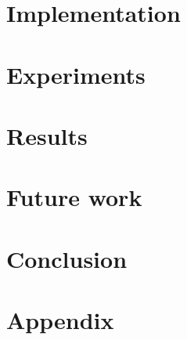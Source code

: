 \documentclass[runningheads,a4paper]{llncs}
\begin{document}
\section{Implementation}
\label{sec:implementation}



\section{Experiments}
\label{sec:experiments}


\section{Results}
\label{sec:results}

\section{Future work}
\label{sec:futurework}


\section{Conclusion}
\label{sec:conclusion}


\section{Appendix}
\label{sec:appendix}



%
%
%
%

 
\end{document}
